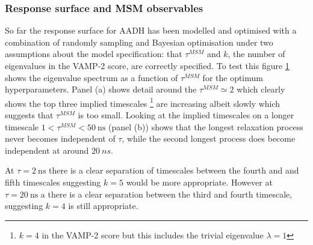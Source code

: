 \subsubsection{Response surface and MSM observables}

\begin{figure}[ht!]
    \centering
    \label{fig:aadh_its}
    
\end{figure}

So far the response surface for AADH has been modelled and optimised with a combination of randomly sampling and Bayesian optimisation under two assumptions about the model specification: that $\tau^{MSM}$ and $k$, the number of eigenvalues in the VAMP-2 score, are correctly specified. To test this figure \ref{fig:aadh_its} shows the eigenvalue spectrum as a function of $\tau^{MSM}$ for the optimum hyperparameters. Panel (a) shows detail around the  $\tau^{MSM} \simeq 2$ which clearly shows the top three implied timescales \footnote{$k=4$ in the VAMP-2 score but this includes the trivial eigenvalue $\lambda = 1$} are increasing albeit slowly which suggests that $\tau^{MSM}$ is too small. Looking at the implied timescales on a longer timescale $1 < \tau^{MSM} < \SI{50}{\nano\second}$ (panel (b)) shows that the longest relaxation process never becomes independent of $\tau$, while the second longest process does become independent at around $\SI{20}{ns}$. 

At $\tau = \SI{2}{\nano\second}$ there is a clear separation of timescales between the fourth and and fifth timescales suggesting $k=5$ would be more appropriate. However at $\tau = \SI{20}{\nano\second}$ a there is a clear separation between the third and fourth timescale, suggesting $k=4$ is still appropriate.  


